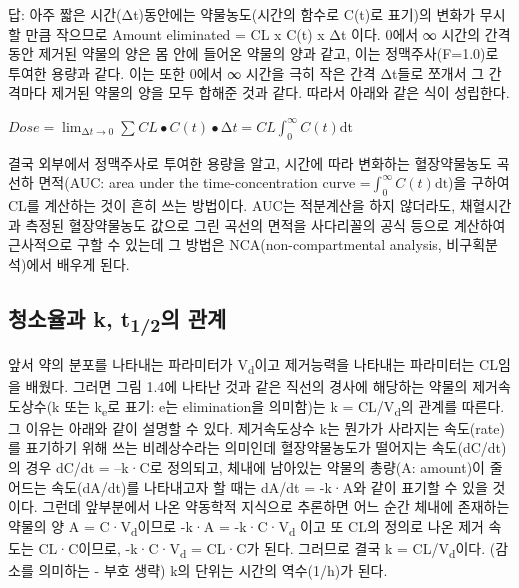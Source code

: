 \documentclass[
  11pt,
  krantz2, a4paper, twoside]{krantz}
\renewenvironment{quote}{\begin{VF}}{\end{VF}}
\begin{document}
\begin{quote}
답: 아주 짧은 시간(Δt)동안에는 약물농도(시간의 함수로 C(t)로 표기)의
변화가 무시할 만큼 작으므로 Amount eliminated = CL x C(t) x Δt 이다.
0에서 ∞ 시간의 간격동안 제거된 약물의 양은 몸 안에 들어온 약물의 양과
같고, 이는 정맥주사(F=1.0)로 투여한 용량과 같다. 이는 또한 0에서 ∞
시간을 극히 작은 간격 Δt들로 쪼개서 그 간격마다 제거된 약물의 양을
모두 합해준 것과 같다. 따라서 아래와 같은 식이 성립한다.

\(Dose = \lim_{\mathrm{\Delta}t \rightarrow 0}{\sum_{}^{}{CL \bullet C\left( t \right) \bullet \mathrm{\Delta}t = CL\int_{0}^{\infty}{C\left( t \right)\text{dt}}}}\)

결국 외부에서 정맥주사로 투여한 용량을 알고, 시간에 따라 변화하는
혈장약물농도 곡선하 면적(AUC: area under the time-concentration curve
=\(\int_{0}^{\infty}{C\left( t \right)\text{dt}}\))을 구하여 CL를
계산하는 것이 흔히 쓰는 방법이다. AUC는 적분계산을 하지 않더라도,
채혈시간과 측정된 혈장약물농도 값으로 그린 곡선의 면적을 사다리꼴의
공식 등으로 계산하여 근사적으로 구할 수 있는데 그 방법은
NCA(non-compartmental analysis, 비구획분석)에서 배우게 된다.
\end{quote}

\hypertarget{uxccaduxc18cuxc728uxacfc-k-t12uxc758-uxad00uxacc4}{%
\subsection{\texorpdfstring{청소율과 k, t\textsubscript{1/2}의 관계}{청소율과 k, t1/2의 관계}}\label{uxccaduxc18cuxc728uxacfc-k-t12uxc758-uxad00uxacc4}}

앞서 약의 분포를 나타내는 파라미터가 V\textsubscript{d}이고 제거능력을 나타내는
파라미터는 CL임을 배웠다. 그러면 그림 1.4에 나타난 것과 같은 직선의
경사에 해당하는 약물의 제거속도상수(k 또는 k\textsubscript{e}로 표기: e는
elimination을 의미함)는 k = CL/V\textsubscript{d}의 관계를 따른다. 그 이유는 아래와
같이 설명할 수 있다. 제거속도상수 k는 뭔가가 사라지는 속도(rate)를
표기하기 위해 쓰는 비례상수라는 의미인데 혈장약물농도가 떨어지는
속도(dC/dt)의 경우 dC/dt = --k·C로 정의되고, 체내에 남아있는 약물의
총량(A: amount)이 줄어드는 속도(dA/dt)를 나타내고자 할 때는 dA/dt =
-k·A와 같이 표기할 수 있을 것이다. 그런데 앞부분에서 나온 약동학적
지식으로 추론하면 어느 순간 체내에 존재하는 약물의 양 A = C·V\textsubscript{d}이므로
-k·A = -k·C·V\textsubscript{d} 이고 또 CL의 정의로 나온 제거 속도는 CL·C이므로,
-k·C·V\textsubscript{d} = CL·C가 된다. 그러므로 결국 k = CL/V\textsubscript{d}이다. (감소를 의미하는
- 부호 생략) k의 단위는 시간의 역수(1/h)가 된다.
\end{document}
